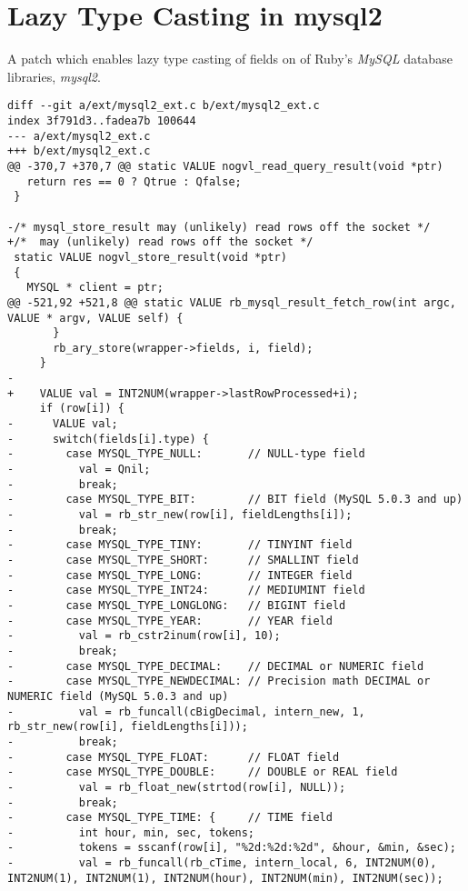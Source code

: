 \chapter{Lazy Type Casting in mysql2} %
\label{ap:ruby19_encoding_patch}

A patch which enables lazy type casting of fields on of Ruby's \textit{MySQL} database libraries, \textit{mysql2}.

\begin{lstlisting}
diff --git a/ext/mysql2_ext.c b/ext/mysql2_ext.c
index 3f791d3..fadea7b 100644
--- a/ext/mysql2_ext.c
+++ b/ext/mysql2_ext.c
@@ -370,7 +370,7 @@ static VALUE nogvl_read_query_result(void *ptr)
   return res == 0 ? Qtrue : Qfalse;
 }
 
-/* mysql_store_result may (unlikely) read rows off the socket */
+/*  may (unlikely) read rows off the socket */
 static VALUE nogvl_store_result(void *ptr)
 {
   MYSQL * client = ptr;
@@ -521,92 +521,8 @@ static VALUE rb_mysql_result_fetch_row(int argc, VALUE * argv, VALUE self) {
       }
       rb_ary_store(wrapper->fields, i, field);
     }
-
+    VALUE val = INT2NUM(wrapper->lastRowProcessed+i);
     if (row[i]) {
-      VALUE val;
-      switch(fields[i].type) {
-        case MYSQL_TYPE_NULL:       // NULL-type field
-          val = Qnil;
-          break;
-        case MYSQL_TYPE_BIT:        // BIT field (MySQL 5.0.3 and up)
-          val = rb_str_new(row[i], fieldLengths[i]);
-          break;
-        case MYSQL_TYPE_TINY:       // TINYINT field
-        case MYSQL_TYPE_SHORT:      // SMALLINT field
-        case MYSQL_TYPE_LONG:       // INTEGER field
-        case MYSQL_TYPE_INT24:      // MEDIUMINT field
-        case MYSQL_TYPE_LONGLONG:   // BIGINT field
-        case MYSQL_TYPE_YEAR:       // YEAR field
-          val = rb_cstr2inum(row[i], 10);
-          break;
-        case MYSQL_TYPE_DECIMAL:    // DECIMAL or NUMERIC field
-        case MYSQL_TYPE_NEWDECIMAL: // Precision math DECIMAL or NUMERIC field (MySQL 5.0.3 and up)
-          val = rb_funcall(cBigDecimal, intern_new, 1, rb_str_new(row[i], fieldLengths[i]));
-          break;
-        case MYSQL_TYPE_FLOAT:      // FLOAT field
-        case MYSQL_TYPE_DOUBLE:     // DOUBLE or REAL field
-          val = rb_float_new(strtod(row[i], NULL));
-          break;
-        case MYSQL_TYPE_TIME: {     // TIME field
-          int hour, min, sec, tokens;
-          tokens = sscanf(row[i], "%2d:%2d:%2d", &hour, &min, &sec);
-          val = rb_funcall(rb_cTime, intern_local, 6, INT2NUM(0), INT2NUM(1), INT2NUM(1), INT2NUM(hour), INT2NUM(min), INT2NUM(sec));

\end{lstlisting}
